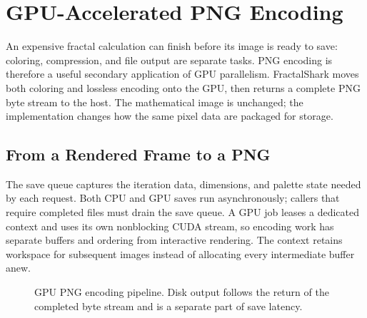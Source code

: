 \section{GPU-Accelerated PNG Encoding}
\label{sec:gpu-png-encoding}

An expensive fractal calculation can finish before its image is ready to save: coloring,
compression, and file output are separate tasks. PNG encoding is therefore a useful secondary
application of GPU parallelism. FractalShark moves both coloring and lossless encoding onto the
GPU, then returns a complete PNG byte stream to the host. The mathematical image is unchanged;
the implementation changes how the same pixel data are packaged for storage.

\subsection{From a Rendered Frame to a PNG}
\label{subsec:png-output}

The save queue captures the iteration data, dimensions, and palette state needed by each request.
Both CPU and GPU saves run asynchronously; callers that require completed files must drain the
save queue. A GPU job leases a dedicated  context and uses its own
nonblocking CUDA stream, so encoding work has separate buffers and ordering from interactive
rendering. The context retains workspace for subsequent images instead of allocating every
intermediate buffer anew.

\begin{figure}[htbp]
\centering
{}
\caption[GPU PNG encoding pipeline]{GPU PNG encoding pipeline. Disk output follows the
return of the completed byte stream and is a separate part of save latency.}
\label{fig:png-encoder-pipeline}
\end{figure}

